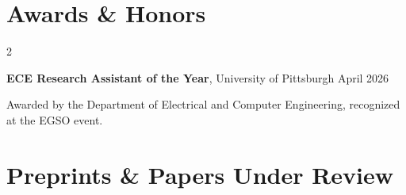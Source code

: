 \documentclass[10pt, letterpaper]{article}
\newenvironment{twocolentry}[2][]{
    \onecolentry
    \def\secondColumn{#2}
    \setcolumnwidth{\fill, 4.5 cm}
    \begin{paracol}{2}
}{
    \switchcolumn \raggedleft \secondColumn
    \end{paracol}
    \endonecolentry
}
\begin{document}
    \section{Awards \& Honors}

        \begin{twocolentry}{
            April 2026
        }
            \textbf{ECE Research Assistant of the Year}, University of Pittsburgh\end{twocolentry}

        \vspace{0.05 cm}
        {Awarded by the Department of Electrical and Computer Engineering, recognized at the EGSO event.}


   \section{Preprints \& Papers Under Review}
\end{document}
